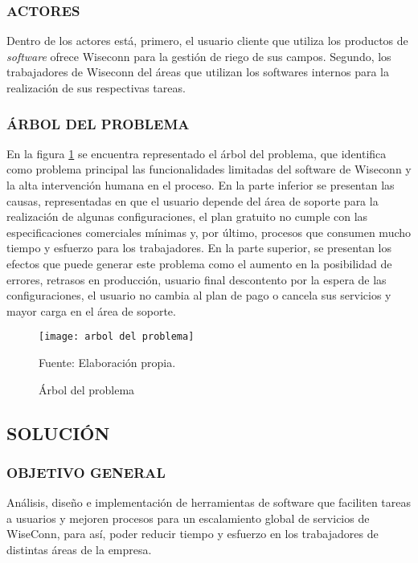 \subsubsection{ACTORES}
Dentro de los actores está, primero, el usuario cliente que utiliza los productos de \textit{software} ofrece Wiseconn para la gestión de riego de sus campos. Segundo, los trabajadores de Wiseconn del áreas que utilizan los softwares internos para la realización de sus respectivas tareas.

\subsubsection{ÁRBOL DEL PROBLEMA}
En la figura \ref{fig:arbolproblema} se encuentra representado el árbol del problema, que identifica como problema principal las funcionalidades limitadas del software de Wiseconn y la alta intervención humana en el proceso.
En la parte inferior se presentan las causas, representadas en que el usuario depende del área de soporte para la realización de algunas configuraciones, el plan gratuito no cumple con las especificaciones comerciales mínimas y, por último, procesos que consumen mucho tiempo y esfuerzo para los trabajadores.
En la parte superior, se presentan los efectos que puede generar este problema como el aumento en la posibilidad de errores, retrasos en producción, usuario final descontento por la espera de las configuraciones, el usuario no cambia al plan de pago o cancela sus servicios y mayor carga en el área de soporte.

\begin{figure}
    \centering
	\texttt{[image: arbol del problema]}
	\caption{\label{fig:arbolproblema} Árbol del problema} Fuente: Elaboración propia.
\end{figure}

\subsection{SOLUCIÓN}

\subsubsection{OBJETIVO GENERAL}

Análisis, diseño e implementación de herramientas de software que faciliten tareas a usuarios y mejoren procesos para un escalamiento global de servicios de WiseConn, para así, poder reducir tiempo y esfuerzo en los trabajadores de distintas áreas de la empresa.

